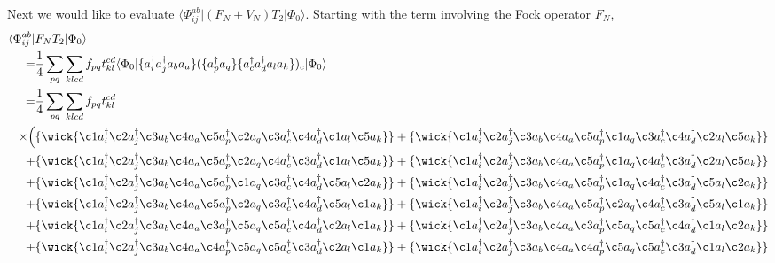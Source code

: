 \documentclass[
    a4paper, aps, twocolumn, floatfix, superscriptaddress,
    nofootinbib]{revtex4-1}
\newcommand{\1}{\mathds{1}}
\newcommand{\bra}[1]{\langle #1\lvert}
\newcommand{\ket}[1]{\rvert #1\rangle}
\begin{document}
		Next we would like to evaluate $\bra{\Phi_{ij}^{ab}}(F_N + V_N)T_2\ket{\Phi_0}$. Starting with the 
		term involving the Fock operator $F_N$,
		\begin{equation}
		\begin{aligned}
			\bra{\Phi_{ij}^{ab}}&F_NT_2\ket{\Phi_0} \\
				=& \frac{1}{4}\sum_{pq}\sum_{klcd}f_{pq}t_{kl}^{cd} \bra{\Phi_0}
					\{a_i^\dagger a_j^\dagger a_b a_a \}(\{a^\dagger_pa_q \}\{a^\dagger_c a^\dagger_d a_l a_k \})_c \ket{\Phi_0} \\
				=& \frac{1}{4}\sum_{pq}\sum_{klcd}f_{pq} t_{kl}^{cd} \\
				\times \Big(
					&\{\wick{\c1 a^\dagger_i \c2 a^\dagger_j \c3 a_b \c4 a_a \c5 a^\dagger_p \c2 a_q \c3 a^\dagger_c \c4 a^\dagger_d \c1 a_l \c5 a_k } \}
				 + \{\wick{\c1 a^\dagger_i \c2 a^\dagger_j \c3 a_b \c4 a_a \c5 a^\dagger_p \c1 a_q \c3 a^\dagger_c \c4 a^\dagger_d \c2 a_l \c5 a_k } \}	\\
			    + &\{\wick{\c1 a^\dagger_i \c2 a^\dagger_j \c3 a_b \c4 a_a \c5 a^\dagger_p \c2 a_q \c4 a^\dagger_c \c3 a^\dagger_d \c1 a_l \c5 a_k } \}
				 + \{\wick{\c1 a^\dagger_i \c2 a^\dagger_j \c3 a_b \c4 a_a \c5 a^\dagger_p \c1 a_q \c4 a^\dagger_c \c3 a^\dagger_d \c2 a_l \c5 a_k } \} \\
		        + &\{\wick{\c1 a^\dagger_i \c2 a^\dagger_j \c3 a_b \c4 a_a \c5 a^\dagger_p \c1 a_q \c3 a^\dagger_c \c4 a^\dagger_d \c5 a_l \c2 a_k } \}
		          + \{\wick{\c1 a^\dagger_i \c2 a^\dagger_j \c3 a_b \c4 a_a \c5 a^\dagger_p \c1 a_q \c4 a^\dagger_c \c3 a^\dagger_d \c5 a_l \c2 a_k } \} \\
		        + &\{\wick{\c1 a^\dagger_i \c2 a^\dagger_j \c3 a_b \c4 a_a \c5 a^\dagger_p \c2 a_q \c3 a^\dagger_c \c4 a^\dagger_d \c5 a_l \c1 a_k } \}
		          + \{\wick{\c1 a^\dagger_i \c2 a^\dagger_j \c3 a_b \c4 a_a \c5 a^\dagger_p \c2 a_q \c4 a^\dagger_c \c3 a^\dagger_d \c5 a_l \c1 a_k } \} \\
		        + &\{\wick{\c1 a^\dagger_i \c2 a^\dagger_j \c3 a_b \c4 a_a \c3 a^\dagger_p \c5 a_q \c5 a^\dagger_c \c4 a^\dagger_d \c2 a_l \c1 a_k } \}
		     	 + \{\wick{\c1 a^\dagger_i \c2 a^\dagger_j \c3 a_b \c4 a_a \c3 a^\dagger_p \c5 a_q \c5 a^\dagger_c \c4 a^\dagger_d \c1 a_l \c2 a_k } \} \\
		        + &\{\wick{\c1 a^\dagger_i \c2 a^\dagger_j \c3 a_b \c4 a_a \c4 a^\dagger_p \c5 a_q \c5 a^\dagger_c \c3 a^\dagger_d \c2 a_l \c1 a_k } \}
		          +\{\wick{\c1 a^\dagger_i \c2 a^\dagger_j \c3 a_b \c4 a_a \c4 a^\dagger_p \c5 a_q \c5 a^\dagger_c \c3 a^\dagger_d \c1 a_l \c2 a_k } \} \\

\end{aligned}
\end{equation}
\end{document}
